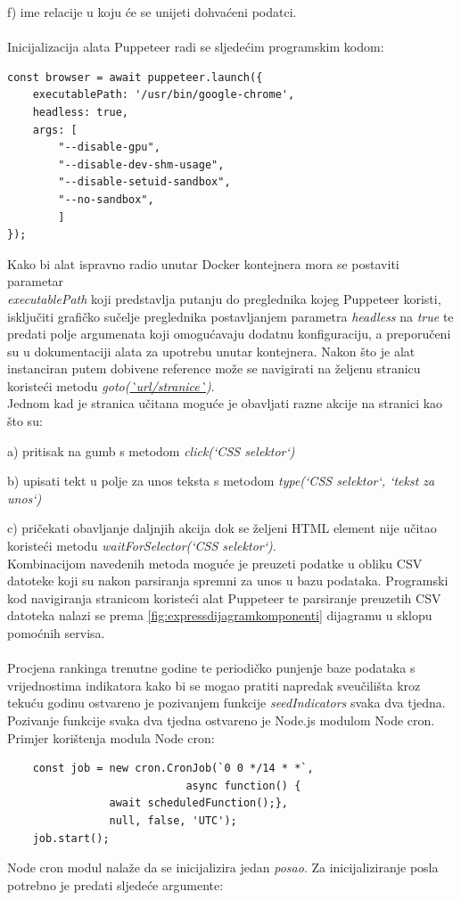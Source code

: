 \documentclass[times, utf8, zavrsni]{fer}
\begin{document}
    f) ime relacije u koju će se unijeti dohvaćeni podatci.
\\\\Inicijalizacija alata Puppeteer radi se sljedećim programskim kodom:
\begin{lstlisting}  
const browser = await puppeteer.launch({
    executablePath: '/usr/bin/google-chrome',
    headless: true,
    args: [
        "--disable-gpu",
        "--disable-dev-shm-usage",
        "--disable-setuid-sandbox",
        "--no-sandbox",
        ]
});
\end{lstlisting} 
Kako bi alat ispravno radio unutar Docker kontejnera mora se postaviti parametar \\\emph{executablePath} koji predstavlja putanju 
do preglednika kojeg Puppeteer koristi, isključiti grafičko sučelje preglednika postavljanjem parametra \emph{headless} na \emph{true} te predati 
polje argumenata koji omogućavaju dodatnu konfiguraciju, a preporučeni su u dokumentaciji alata za upotrebu unutar kontejnera.
Nakon što je alat instanciran putem dobivene reference može se navigirati na željenu stranicu koristeći metodu \emph{goto(\url{`url/stranice`})}.
\\Jednom kad je stranica učitana moguće je obavljati razne akcije na stranici kao što su:

    a) pritisak na gumb s metodom \emph{click(`CSS selektor`)}

    b) upisati tekt u polje za unos teksta s metodom \emph{type(`CSS selektor`, `tekst za unos`)}

    c) pričekati obavljanje daljnjih akcija dok se željeni HTML element nije učitao koristeći metodu \emph{waitForSelector(`CSS selektor`)}.
\\Kombinacijom navedenih metoda moguće je preuzeti podatke u obliku CSV datoteke koji su nakon parsiranja spremni za unos u bazu podataka.
Programski kod navigiranja stranicom koristeći alat Puppeteer te parsiranje preuzetih CSV datoteka nalazi se prema \ref{fig:expressdijagramkomponenti}
dijagramu u sklopu pomoćnih servisa.
\\\\Procjena rankinga trenutne godine te periodičko punjenje baze podataka s vrijednostima indikatora kako bi se mogao pratiti napredak 
sveučilišta kroz tekuću godinu ostvareno je pozivanjem funkcije \emph{seedIndicators} svaka dva tjedna. Pozivanje funkcije svaka dva tjedna 
ostvareno je Node.js modulom Node cron. 
\\Primjer korištenja modula Node cron:
\begin{lstlisting}  
    const job = new cron.CronJob(`0 0 */14 * *`, 
                            async function() {
                await scheduledFunction();}, 
                null, false, 'UTC');
    job.start();
\end{lstlisting}
Node cron modul nalaže da se inicijalizira jedan \emph{posao}. Za inicijaliziranje posla potrebno je predati sljedeće argumente:
\end{document}
